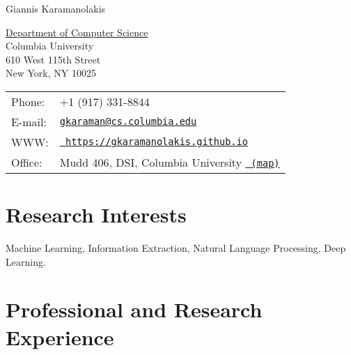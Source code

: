 \documentclass[letterpaper]{article}
\def\name{Giannis Karamanolakis}
\renewenvironment{itemize}{
  \begin{list}{}{
    \setlength{\leftmargin}{1.5em}
  }
}{
  \end{list}
}
\begin{document}



{\huge \name}


\vspace{0.25in}

\begin{minipage}{0.45\linewidth}
  \href{http://www.cs.columbia.edu/}{Department of Computer Science} \\
  Columbia University \\
  610 West 115th Street\\
  New York, NY 10025
\end{minipage}
\begin{minipage}{0.45\linewidth}
  \begin{tabular}{ll}
    Phone: & +1 (917) 331-8844 \\
    E-mail: & \href{mailto:gkaraman@cs.columbia.edu}{\tt gkaraman@cs.columbia.edu} \\
    WWW: & \href{https://gkaramanolakis.github.io}{\tt
    https://gkaramanolakis.github.io} \\
    Office: & Mudd 406, DSI, Columbia University \href{https://goo.gl/maps/CsUb6tbN69L2}{\tt
    (map)}
  \end{tabular}
\end{minipage}

\section*{Research Interests}
\begin{itemize}
  \item Machine Learning, Information Extraction, Natural Language Processing, Deep Learning. %
\end{itemize}


\section*{Professional and Research Experience}
\end{document}
